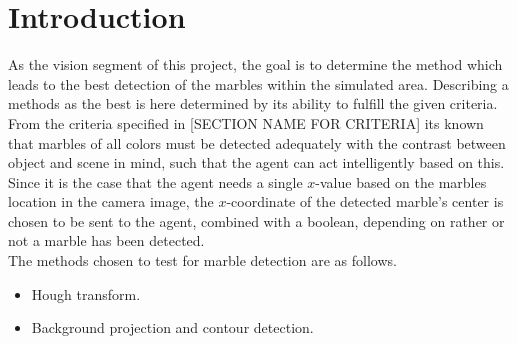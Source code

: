 \documentclass[../../main.tex]{subfile}
\begin{document}
\section{Introduction}

As the vision segment of this project, the goal is to determine the method which leads to
the best detection of the marbles within the simulated area. Describing a methods as the best 
is here determined by its ability to fulfill the given criteria.\\
From the criteria specified in [SECTION NAME FOR CRITERIA] its known that marbles of all colors must be detected
adequately with the contrast between object and scene in mind, such that the agent can act intelligently based on this. Since it is the case that the agent needs a single
$x$-value based on the marbles location in the camera image, the $x$-coordinate of the detected marble's center is chosen to
be sent to the agent, combined with a boolean, depending on rather or not a marble has been detected.\\
The methods chosen to test for marble detection are as follows.
\begin{itemize}
    \item Hough transform.
    \item Background projection and contour detection.
\end{itemize}
\end{document}
